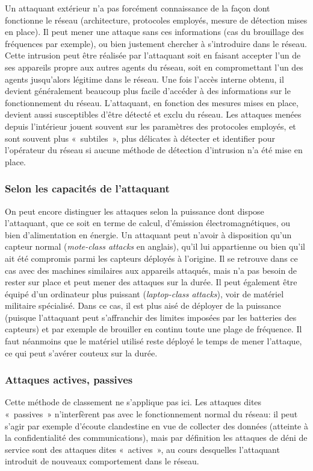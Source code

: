 Un attaquant extérieur n'a pas forcément connaissance de la façon dont fonctionne le réseau (architecture, protocoles employés, mesure de détection mises en place).
Il peut mener une attaque sans ces informations (cas du brouillage des fréquences par exemple), ou bien justement chercher à s'introduire dans le réseau.
Cette intrusion peut être réalisée par l'attaquant soit en faisant accepter l'un de ses appareils propre aux autres agents du réseau, soit en compromettant l'un des agents jusqu'alors légitime dans le réseau.
Une fois l'accès interne obtenu, il devient généralement beaucoup plus facile d'accéder à des informations sur le fonctionnement du réseau.
L'attaquant, en fonction des mesures mises en place, devient aussi susceptibles d'être détecté et exclu du réseau.
Les attaques menées depuis l'intérieur jouent souvent sur les paramètres des protocoles employés, et sont souvent plus « subtiles », plus délicates à détecter et identifier pour l'opérateur du réseau si aucune méthode de détection d'intrusion n'a été mise en place.

    \subsubsection{Selon les capacités de l'attaquant}
On peut encore distinguer les attaques selon la puissance dont dispose l'attaquant, que ce soit en terme de calcul, d'émission électromagnétiques, ou bien d'alimentation en énergie.
Un attaquant peut n'avoir à disposition qu'un capteur normal (\textit{mote-class attacks} en anglais), qu'il lui appartienne ou bien qu'il ait été compromis parmi les capteurs déployés à l'origine.
Il se retrouve dans ce cas avec des machines similaires aux appareils attaqués, mais n'a pas besoin de rester sur place et peut mener des attaques sur la durée.
Il peut également être équipé d'un ordinateur plus puissant (\textit{laptop-class attacks}), voir de matériel militaire spécialisé.
Dans ce cas, il est plus aisé de déployer de la puissance (puisque l'attaquant peut s'affranchir des limites imposées par les batteries des capteurs) et par exemple de brouiller en continu toute une plage de fréquence.
Il faut néanmoins que le matériel utilisé reste déployé le temps de mener l'attaque, ce qui peut s'avérer couteux sur la durée.

    \subsubsection{Attaques actives, passives}
Cette méthode de classement ne s'applique pas ici.
Les attaques dites « passives » n'interfèrent pas avec le fonctionnement normal du réseau: il peut s'agir par exemple d'écoute clandestine en vue de collecter des données (atteinte à la confidentialité des communications), mais par définition les attaques de déni de service sont des attaques dites « actives », au cours desquelles l'attaquant introduit de nouveaux comportement dans le réseau.

